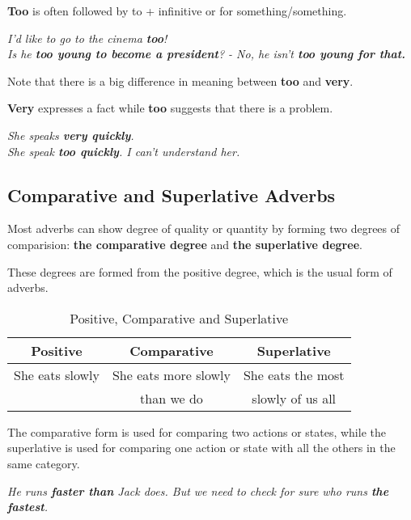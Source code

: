 \documentclass[hidelinks,10pt,a4paper]{article}
\begin{document}
\textbf{Too} is often followed by to + infinitive or for something/something.

\begin{center}
	\textit{I'd like to go to the cinema \textbf{too}!\\
	Is he \textbf{too young to become a president}? - No, he isn't \textbf{too young for that.}}
\end{center}

Note that there is a big difference in meaning between \textbf{too} and \textbf{very}.

\textbf{Very} expresses a fact while \textbf{too} suggests that there is a problem.

\begin{center}
	\textit{She speaks \textbf{very quickly}. \\
	She speak \textbf{too quickly}. I can't understand her. }
\end{center}

\subsection{Comparative and Superlative Adverbs}
Most adverbs can show degree of quality or quantity by forming two degrees of comparision: \textbf{the comparative degree} and \textbf{the superlative degree}.

These degrees are formed from the positive degree, which is the usual form of adverbs.

\begin{table}[h]
\begin{center}
\begin{tabular}{|c|c|c|}
	\hline
	\textbf{Positive} & \textbf{Comparative} & \textbf{Superlative} \\ \hline
	She eats slowly & She eats more slowly & She eats the most \\
	 & than we do & slowly of us all \\ \hline
\end{tabular}
\end{center}
\caption{Positive, Comparative and Superlative} \label{tab:csad1}
\end{table}

The comparative form is used for comparing two actions or states, while the superlative is used for comparing one action or state with all the others in the same category.

\begin{center}
	\textit{He runs \textbf{faster than} Jack does. But we need to check for sure who runs \textbf{the fastest}. }
\end{center}
\end{document}
